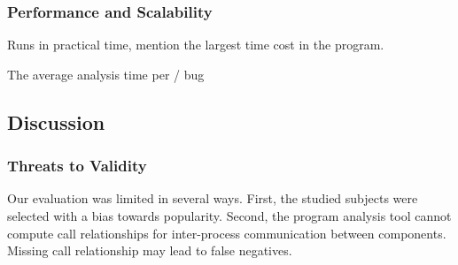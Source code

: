 \subsubsection{Performance and Scalability}

Runs in practical time, mention the largest time cost in the program.

The average analysis time per / bug

\subsection{Discussion}

\subsubsection{Threats to Validity}

Our evaluation was limited in several ways. First, the studied
subjects were selected with a bias towards popularity. Second,
the program analysis tool cannot compute call relationships
for inter-process communication between components. Missing
call relationship may lead to false negatives.
